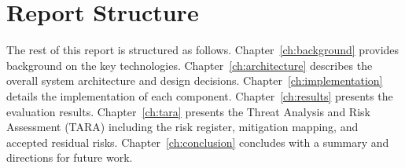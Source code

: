 \section{Report Structure}

The rest of this report is structured as follows.
Chapter~\ref{ch:background} provides background on the key technologies.
Chapter~\ref{ch:architecture} describes the overall system architecture and design decisions.
Chapter~\ref{ch:implementation} details the implementation of each component.
Chapter~\ref{ch:results} presents the evaluation results.
Chapter~\ref{ch:tara} presents the Threat Analysis and Risk Assessment (TARA) including
the risk register, mitigation mapping, and accepted residual risks.
Chapter~\ref{ch:conclusion} concludes with a summary and directions for future work.
